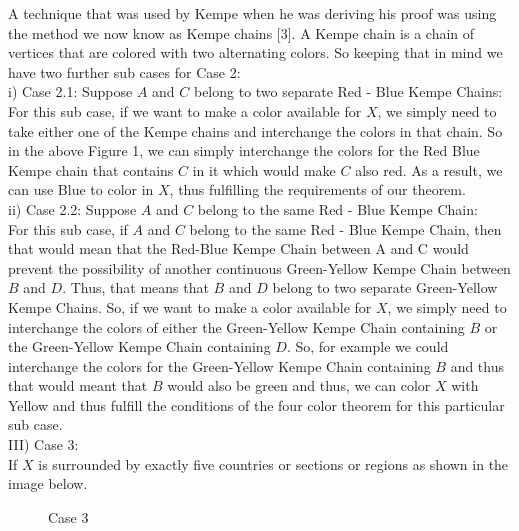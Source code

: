 \documentclass[11pt]{article}
\newcommand{\forceindent}{\leavevmode{\parindent=1.5em\indent}}
\begin{document}
A technique that was used by Kempe when he was deriving his proof was using the method we now know as Kempe chains [3]. A Kempe chain is a chain of vertices that are colored with two alternating colors. So keeping that in mind we have two further sub cases for Case 2:\\
\forceindent i) Case 2.1: Suppose $A$ and $C$ belong to two separate Red - Blue Kempe Chains:\\
\forceindent \forceindent For this sub case, if we want to make a color available for $X$, we simply need to take \forceindent \forceindent either one of the Kempe chains and interchange the colors in that chain. So in the \forceindent \forceindent above Figure 1, we can simply interchange the colors for the Red Blue Kempe chain that \forceindent \forceindent contains $C$ in it which would make $C$ also red. As a result, we can use Blue to color in \forceindent \forceindent $X$, thus fulfilling the requirements of our theorem. \\
\forceindent ii) Case 2.2: Suppose $A$ and $C$ belong to the same Red - Blue Kempe Chain:\\
 \forceindent \forceindent For this sub case, if $A$ and $C$ belong to the same Red - Blue Kempe Chain, then \forceindent \forceindent that  would mean that the Red-Blue Kempe Chain between A and C would prevent \forceindent \forceindent the possibility of another continuous Green-Yellow Kempe Chain between $B$ and $D$. \forceindent \forceindent Thus, that means that $B$ and $D$ belong to two separate Green-Yellow Kempe Chains. \forceindent \forceindent So, if we want to make a color available for $X$, we simply need to interchange the   \forceindent \forceindent colors of either the Green-Yellow Kempe Chain containing $B$ or the Green-Yellow  Kempe  \forceindent \forceindent Chain containing $D$. So, for example we could interchange the colors for the Green-Yellow  \forceindent \forceindent Kempe Chain containing $B$ and thus that would meant that $B$ would also be green and  \forceindent \forceindent thus, we can color $X$ with Yellow and thus fulfill the conditions of the four color theorem  \forceindent \forceindent for this particular sub case.\\
 
 III) Case 3:\\
\forceindent If $X$ is surrounded by exactly five countries or sections or regions as shown in the image \forceindent below.\\
\begin{figure}[ht!]
\centering
{}
\caption{Case 3} 
\end{figure}
 
\end{document}
